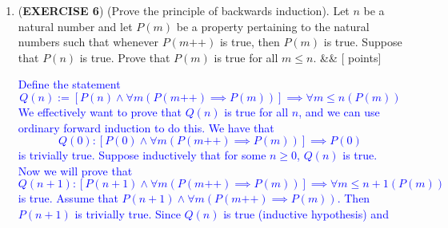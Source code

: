 \documentclass[12pt]{article}
\newcommand{\points}[1]{\hfill {[#1 points]}}
\newcommand{\problem}[2][]{%
  \item {#2}%
  \ifx&#1&%
  \else%
    \points{#1}%
  \fi
  \par\vspace{0.5em}
}
\begin{document}
\begin{enumerate}[leftmargin=*, label=\textbf{\arabic*.}]
	\problem{(\textbf{EXERCISE 6}) (Prove the principle of backwards induction). Let $n$ be a natural number and let $P(m)$ be a property pertaining to the natural numbers such that whenever $P(m\text{++})$ is true, then $P(m)$ is true. Suppose that $P(n)$ is true. Prove that $P(m)$ is true for all $m \leq n$.}
	\textcolor{blue}{Define the statement
	\begin{equation}
	Q(n) := [P(n) \land \forall m (P(m\text{++}) \implies P(m))] \implies \forall m \leq n (P(m))
	\label{eq:2}
	\end{equation}
	We effectively want to prove that $Q(n)$ is true for all $n$, and we can use ordinary forward induction to do this. We have that $$Q(0) : [P(0) \land \forall m (P(m\text{++}) \implies P(m))] \implies P(0)$$ is trivially true. Suppose inductively that for some $n \geq 0$, $Q(n)$ is true. Now we will prove that $$Q(n+1) : [P(n+1) \land \forall m (P(m\text{++}) \implies P(m))] \implies \forall m \leq n+1 (P(m))$$ is true. Assume that $P(n+1) \land \forall m (P(m\text{++}) \implies P(m))$. Then $P(n+1)$ is trivially true. Since $Q(n)$ is true (inductive hypothesis) and  
	}
	
\end{enumerate}
\end{document}
